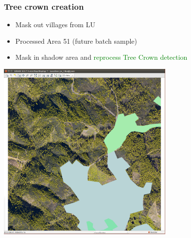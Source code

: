 \documentclass[serif,mathserif,aspectratio=169]{beamer}
\begin{document}
\begin{frame}
  \frametitle{Tree crown creation}
\begin{center}
\begin{itemize}
 \item Mask out villages from LU
  \item Processed Area 51 (future batch sample)
 \item Mask in shadow area and \textcolor{green}{reprocess Tree Crown detection} 
\end{itemize}
\end{center}
\end{frame}


\begin{frame}[plain]
\begin{center}
\includegraphics[height=9cm]{urban_masked.png}
\end{center}
\end{frame}


{
\begin{frame}[plain]
\end{frame}}
\end{document}
